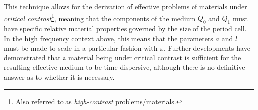 This technique allows for the derivation of effective problems of materials under \emph{critical contrast}\footnote{Also referred to as \emph{high-contrast} problems/materials.}, meaning that the components of the medium $Q_0$ and $Q_1$ must have specific relative material properties governed by the size of the period cell.
In the high frequency context above, this means that the parameters $a$ and $l$ must be made to scale in a particular fashion with $\varepsilon$.
Further developments  have demonstrated that a material being under critical contrast is sufficient for the resulting effective medium to be time-dispersive, although there is no definitive answer as to whether it is necessary.